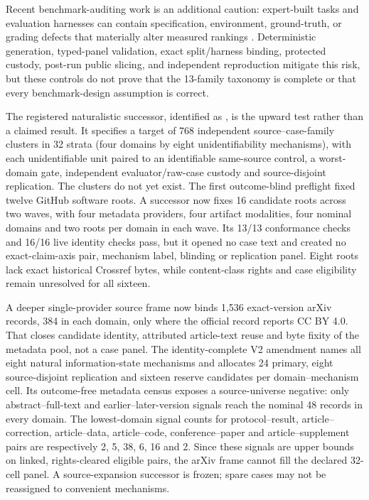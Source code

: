 Recent benchmark-auditing work is an additional caution: expert-built tasks and evaluation harnesses can contain specification, environment, ground-truth, or grading defects that materially alter measured rankings \citep{benchguard2026,autobenchmarkaudit2026,hal2025}. Deterministic generation, typed-panel validation, exact split/harness binding, protected custody, post-run public slicing, and independent reproduction mitigate this risk, but these controls do not prove that the 13-family taxonomy is complete or that every benchmark-design assumption is correct.

The registered naturalistic successor, identified as
, is the upward test rather than a claimed result.  It
specifies a target of 768 independent source--case-family clusters in 32 strata
(four domains by eight unidentifiability mechanisms), with each unidentifiable
unit paired to an identifiable same-source control, a worst-domain gate,
independent evaluator/raw-case custody and source-disjoint replication. The
clusters do not yet exist. The first outcome-blind preflight fixed twelve
GitHub software roots. A successor now fixes 16 candidate roots across two
waves, with four metadata providers, four artifact modalities, four nominal
domains and two roots per domain in each wave. Its 13/13 conformance checks
and 16/16 live identity checks pass, but it opened no case text and created no
exact-claim-axis pair, mechanism label, blinding or replication panel. Eight
roots lack exact historical Crossref bytes, while content-class rights and
case eligibility remain unresolved for all sixteen.

A deeper single-provider source frame now binds 1,536 exact-version arXiv
records, 384 in each domain, only where the official record reports CC BY 4.0.
That closes candidate identity, attributed article-text reuse and byte fixity of
the metadata pool, not a case panel.  The identity-complete V2 amendment names
all eight natural information-state mechanisms and allocates 24 primary, eight
source-disjoint replication and sixteen reserve candidates per domain--mechanism
cell.  Its outcome-free metadata census exposes a source-universe negative:
only abstract--full-text and earlier--later-version signals reach the nominal 48
records in every domain.  The lowest-domain signal counts for protocol--result,
article--correction, article--data, article--code, conference--paper and
article--supplement pairs are respectively 2, 5, 38, 6, 16 and 2.  Since these
signals are upper bounds on linked, rights-cleared eligible pairs, the arXiv
frame cannot fill the declared 32-cell panel.  A source-expansion successor is
frozen; spare cases may not be reassigned to convenient mechanisms.

